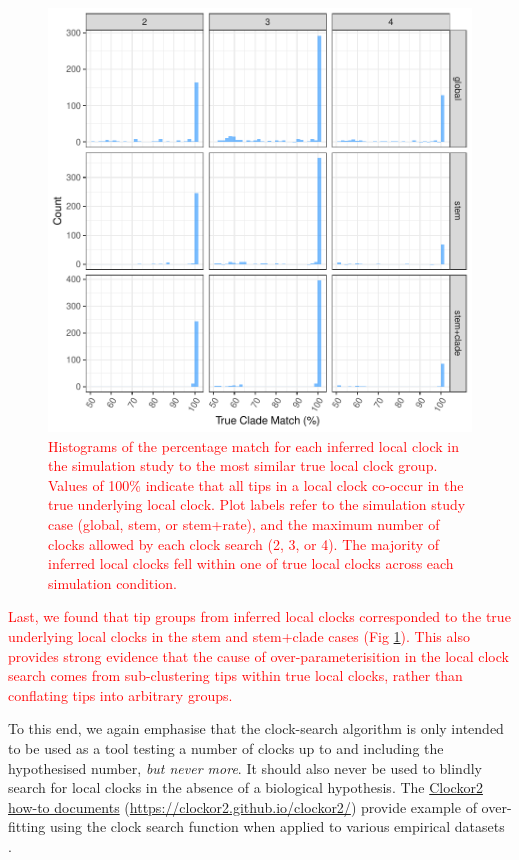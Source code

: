 \documentclass{article}
\begin{document}
\begin{figure}[H]
\centering
\includegraphics[width = 0.7\linewidth]{cladeMatch.pdf}
\caption{\textcolor{red}{Histograms of the percentage match for each inferred local clock in the simulation study to the most similar true local clock group. Values of 100\% indicate that all tips in a local clock co-occur in the true underlying local clock. Plot labels refer to the simulation study case (global, stem, or stem+rate), and the maximum number of clocks allowed by each clock search (2, 3, or 4). The majority of inferred local clocks fell within one of true local clocks across each simulation condition.}}
\label{fig:cladeMatch}
\end{figure}

\textcolor{red}{Last, we found that tip groups from inferred local clocks corresponded to the true underlying local clocks in the stem and stem+clade cases (Fig \ref{fig:cladeMatch}). This also provides strong evidence that the cause of over-parameterisition in the local clock search comes from sub-clustering tips within true local clocks, rather than conflating tips into arbitrary groups.}

To this end, we again emphasise that the clock-search algorithm is only intended to be used as a tool testing a number of clocks up to and including the hypothesised number, \emph{but never more}. It should also never be used to blindly search for local clocks in the absence of a biological hypothesis. The \href{https://clockor2.github.io/clockor2/}{Clockor2 how-to documents} (\url{https://clockor2.github.io/clockor2/}) provide example of over-fitting using the clock search function when applied to various empirical datasets \citep{porter2023evolutionary,dudas_mers-cov_2018}.
\newpage
\end{document}
